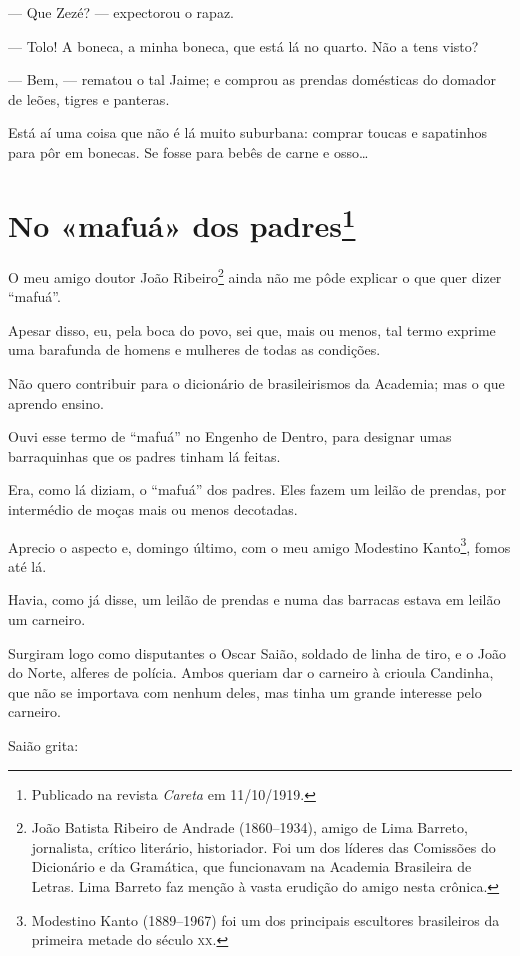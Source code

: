 --- Que Zezé? --- expectorou o rapaz.

--- Tolo! A boneca, a minha boneca, que está lá no quarto. Não a tens
visto?

--- Bem, --- rematou o tal Jaime; e comprou as prendas domésticas do
domador de leões, tigres e panteras.

Está aí uma coisa que não é lá muito suburbana: comprar toucas e
sapatinhos para pôr em bonecas. Se fosse para bebês de carne e osso\ldots{}

\chapter[No «mafuá» dos padres]{No «mafuá» dos padres\footnote[*]{Publicado na revista \emph{Careta} em 11/10/1919.}}

O meu amigo doutor João Ribeiro\footnote{João Batista Ribeiro de Andrade
  (1860--1934), amigo de Lima Barreto, jornalista, crítico literário,
  historiador. Foi um dos líderes das Comissões do Dicionário e da
  Gramática, que funcionavam na Academia Brasileira de Letras. Lima
  Barreto faz menção à vasta erudição do amigo nesta crônica.} ainda não
me pôde explicar o que quer dizer ``mafuá''.

Apesar disso, eu, pela boca do povo, sei que, mais ou menos, tal termo
exprime uma barafunda de homens e mulheres de todas as condições.

Não quero contribuir para o dicionário de brasileirismos da Academia;
mas o que aprendo ensino.

Ouvi esse termo de ``mafuá'' no Engenho de Dentro, para designar umas
barraquinhas que os padres tinham lá feitas.

Era, como lá diziam, o ``mafuá'' dos padres. Eles fazem um leilão de
prendas, por intermédio de moças mais ou menos decotadas.

Aprecio o aspecto e, domingo último, com o meu amigo Modestino
Kanto\footnote{Modestino Kanto (1889--1967) foi um dos principais
  escultores brasileiros da primeira metade do século \textsc{xx}.}, fomos até
lá.

Havia, como já disse, um leilão de prendas e numa das barracas estava em
leilão um carneiro.

Surgiram logo como disputantes o Oscar Saião, soldado de linha de tiro,
e o João do Norte, alferes de polícia. Ambos queriam dar o carneiro à
crioula Candinha, que não se importava com nenhum deles, mas tinha um
grande interesse pelo carneiro.

Saião grita:

